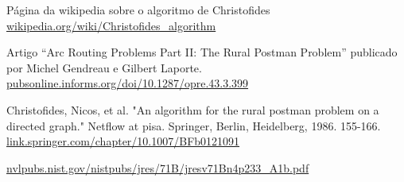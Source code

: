 \documentclass[12pt, a4paper]{article}
\begin{document}
\begin{thebibliography}{9}
    Página da wikipedia sobre o algoritmo de Christofides\\
    \href{https://en.wikipedia.org/wiki/Christofides_algorithm}{wikipedia.org/wiki/Christofides\_algorithm}

    Artigo ``Arc Routing Problems Part II: The Rural Postman Problem'' publicado por Michel Gendreau e Gilbert Laporte.
    \href{https://pubsonline.informs.org/doi/10.1287/opre.43.3.399}{pubsonline.informs.org/doi/10.1287/opre.43.3.399}


    Christofides, Nicos, et al. "An algorithm for the rural postman problem on a directed graph." Netflow at pisa. Springer, Berlin, Heidelberg, 1986. 155-166.\\
    \href{https://link.springer.com/chapter/10.1007/BFb0121091}{link.springer.com/chapter/10.1007/BFb0121091}


    \href{https://nvlpubs.nist.gov/nistpubs/jres/71B/jresv71Bn4p233_A1b.pdf<Paste>}{nvlpubs.nist.gov/nistpubs/jres/71B/jresv71Bn4p233\_A1b.pdf}    
	\end{thebibliography}
 
\end{document}
